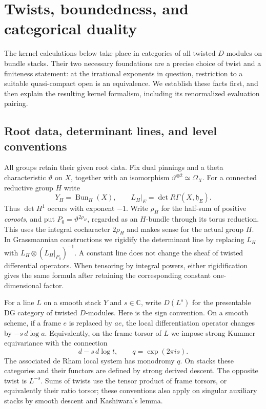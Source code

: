 \section{Twists, boundedness, and categorical duality}\label{sec:foundations}

The kernel calculations below take place in categories of all twisted
$D$-modules on bundle stacks.  Their two necessary foundations are a precise
choice of twist and a finiteness statement: at the irrational exponents in
question, restriction to a suitable quasi-compact open is an equivalence.
We establish these facts first, and then explain the resulting kernel
formalism, including its renormalized evaluation pairing.

\subsection{Root data, determinant lines, and level conventions}

All groups retain their given root data.  Fix dual pinnings and a theta
characteristic $\vartheta$ on $X$, together with an isomorphism
$\vartheta^{\otimes2}\simeq\Omega_X$.  For a connected reductive group $H$ write
\[
 Y_H=\operatorname{Bun}_H(X),\qquad
 L_H|_E=\det R\Gamma(X,\mathfrak h_E).
\]
Thus $\det H^1$ occurs with exponent $-1$.  Write $\rho_H$ for the half-sum
of positive \emph{coroots}, and put $P_0=\vartheta^{2\rho_H}$, regarded as an
$H$-bundle through its torus reduction.  This uses the integral cocharacter
$2\rho_H$ and makes sense for the actual group $H$.  In Grassmannian
constructions we rigidify the determinant line by replacing $L_H$ with
$L_H\otimes(L_H|_{P_0})^{-1}$.  A constant line does not change the sheaf of
twisted differential operators.  When tensoring by integral powers, either
rigidification gives the same formula after retaining the corresponding
constant one-dimensional factor.

For a line $L$ on a smooth stack $Y$ and $s\in\mathbb C$, write $D(L^s)$ for
the presentable DG category of twisted $D$-modules.  Here is the sign
convention.  On a smooth scheme, if a frame $e$ is replaced by $ae$, the
local differentiation operator changes by $-s\,d\log a$.  Equivalently,
on the frame torsor of $L$ we impose strong Kummer equivariance with the
connection
\begin{equation}\label{foundations:kummer}
 d-s\,d\log t,\qquad q=\exp(2\pi i s).
\end{equation}
The associated de Rham local system has monodromy $q$.  On stacks these
categories and their functors are defined by strong derived descent.
The opposite twist is $L^{-s}$.  Sums of twists use the tensor product of
frame torsors, or equivalently their ratio torsor; these conventions also
apply on singular auxiliary stacks by smooth descent and Kashiwara's lemma.

